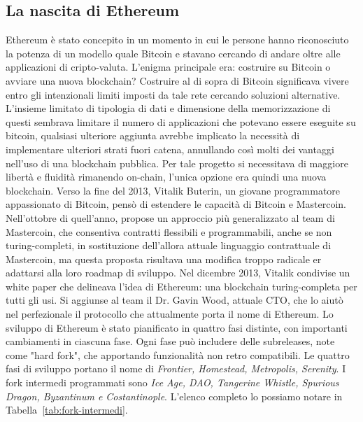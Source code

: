 \subsection*{La nascita di Ethereum}
Ethereum è stato concepito in un momento in cui le persone hanno riconosciuto la potenza di un modello quale Bitcoin e stavano cercando di andare oltre alle applicazioni di cripto-valuta. L'enigma principale era: costruire su Bitcoin o avviare una nuova blockchain? Costruire al di sopra di Bitcoin significava vivere entro gli intenzionali limiti imposti da tale rete cercando soluzioni alternative. L'insieme limitato di tipologia di dati e dimensione della memorizzazione di questi sembrava limitare il numero di applicazioni che potevano essere eseguite su bitcoin, qualsiasi ulteriore aggiunta avrebbe implicato la necessità di implementare ulteriori strati fuori catena, annullando così molti dei vantaggi nell'uso di una blockchain pubblica. Per tale progetto si necessitava di maggiore libertà e fluidità rimanendo on-chain, l'unica opzione era quindi una nuova blockchain.
Verso la fine del 2013, Vitalik Buterin, un giovane programmatore appassionato di Bitcoin, pensò di estendere le capacità di Bitcoin e Mastercoin. Nell'ottobre di quell'anno, propose un approccio più generalizzato al team di Mastercoin, che consentiva contratti flessibili e programmabili, anche se non turing-completi, in sostituzione dell'allora attuale linguaggio contrattuale di Mastercoin, ma questa proposta risultava una modifica troppo radicale er adattarsi alla loro roadmap di sviluppo. 
Nel dicembre 2013, Vitalik condivise un white paper che delineava l'idea di Ethereum: una blockchain turing-completa per tutti gli usi. Si aggiunse al team il Dr. Gavin Wood, attuale CTO, che lo aiutò nel perfezionale il protocollo che attualmente porta il nome di Ethereum. 
Lo sviluppo di Ethereum è stato pianificato in quattro fasi distinte, con importanti cambiamenti in ciascuna fase. Ogni fase può includere delle subreleases, note come "hard fork", che apportando funzionalità non retro compatibili. Le quattro fasi di sviluppo portano il nome di \textit{Frontier, Homestead, Metropolis, Serenity}. I fork intermedi programmati sono \textit{Ice Age, DAO, Tangerine Whistle, Spurious Dragon, Byzantinum e Costantinople}. L'elenco completo lo possiamo notare in Tabella~\ref{tab:fork-intermedi}.
%
